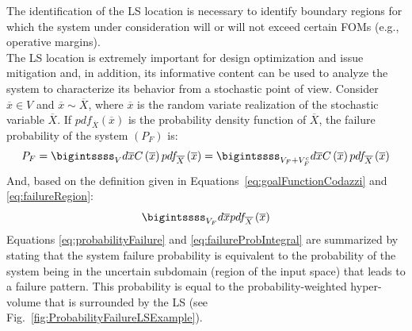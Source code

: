The identification of the LS location is necessary to identify boundary regions for which the system under consideration will or will not exceed certain FOMs (e.g., operative margins).
\\The LS location is extremely important for design optimization and issue mitigation and, in addition, its informative content can be used to analyze the system to characterize its behavior from a stochastic point of view. Consider $\overline{x} \in V$ and $\overline{x}\sim \overline{X}$,
where $\overline{x}$ is the random variate realization of the stochastic variable $\overline{X}$.
If $pdf_{\overline{X}}\left ( \overline{x} \right ) $ is the probability density function of $ \overline{X}$, the failure probability of the system $\left ( P_{F} \right )$ is:
\begin{equation}
\label{eq:probabilityFailure}
P_{F} = \bigintssss_{V}d\overline{x}C\left ( \overline{x} \right )pdf_{\overline{X}}\left ( \overline{x} \right ) = \bigintssss_{V_{F}+V_{F}^{c}}d\overline{x}C\left ( \overline{x} \right )pdf_{\overline{X}}\left ( \overline{x} \right )
\end{equation}
And, based on the definition given in Equations~\ref{eq:goalFunctionCodazzi} and \ref{eq:failureRegion}:
\begin{equation}
 \label{eq:failureProbIntegral}
 \bigintssss_{V_{F}}d\overline{x}pdf_{\overline{X}}\left ( \overline{x} \right ) 
 \end{equation}
Equations \ref{eq:probabilityFailure} and \ref{eq:failureProbIntegral} are summarized by stating that the system failure probability is 
equivalent to the probability of the system being in the uncertain 
subdomain (region of the input space) that leads to a failure pattern. 
This probability is equal to the probability-weighted hyper-volume that is surrounded by the LS (see Fig.~\ref{fig:ProbabilityFailureLSExample}).
